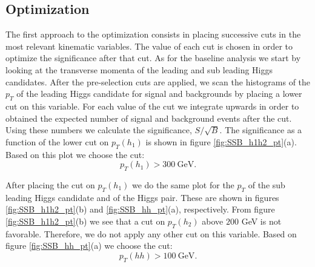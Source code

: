 \subsection{Optimization}
\label{sec:opt}



The first approach to the optimization consists in placing successive cuts in the most relevant kinematic variables. The value of each cut is chosen in order to optimize the significance after that cut. As for the baseline analysis we start by looking at the transverse momenta of the leading and sub leading Higgs candidates. After the pre-selection cuts are applied, we scan the histograms of the $p_T$ of the leading Higgs candidate for signal and backgrounds by placing a lower cut on this variable. For each value of the cut we integrate upwards in order to obtained the expected number of signal and background events after the cut. Using these numbers we calculate the significance, $S/\sqrt{B}$. The significance as a function of the lower cut on $p_T(h_1)$ is shown in figure \ref{fig:SSB_h1h2_pt}(a). Based on this plot we choose the cut:	
\begin{equation}
	p_T(h_1)>300~\text{GeV}.
\end{equation}

After placing the cut on $p_T(h_1)$ we do the same plot for the $p_T$ of the sub leading Higgs candidate and of the Higgs pair. These are shown in figures \ref{fig:SSB_h1h2_pt}(b) and \ref{fig:SSB_hh_pt}(a), respectively. From figure \ref{fig:SSB_h1h2_pt}(b) we see that a cut on $p_T(h_2)$ above $200$ GeV is not favorable. Therefore, we do not apply any other cut on this variable. Based on figure \ref{fig:SSB_hh_pt}(a) we choose the cut:
\begin{equation}
	p_T(hh)>100~\text{GeV}.
\end{equation}

